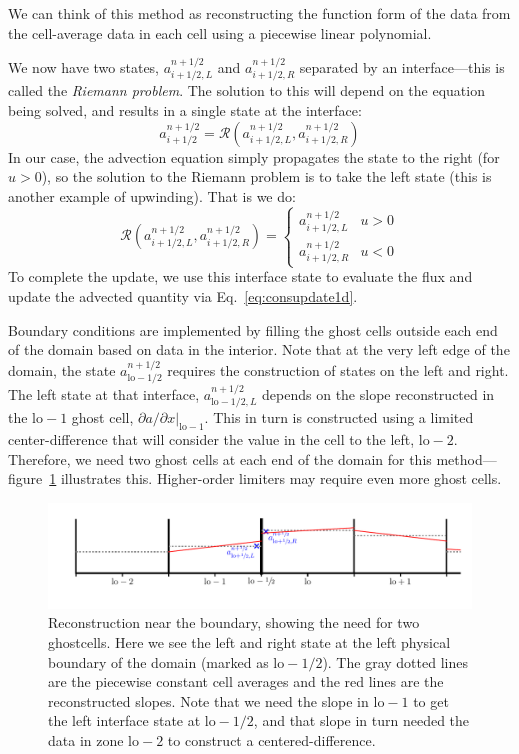 We can think of this method as reconstructing the function form of the
data from the cell-average data in each cell using  a piecewise linear
polynomial. 

We now have two states, $a_{i+1/2,L}^{n+1/2}$ and
$a_{i+1/2,R}^{n+1/2}$ separated by an interface---this is called the
{\em Riemann problem}.
%
The solution to this will depend on the equation being solved, and
results in a single state at the interface:
\begin{equation}
a_{i+1/2}^{n+1/2} = \mathcal{R}(a_{i+1/2,L}^{n+1/2},a_{i+1/2,R}^{n+1/2})
\end{equation}
In our case, the advection equation simply propagates the state to the
right (for $u > 0$), so the solution to the Riemann problem is to take
the left state (this is another example of upwinding).  That is we do:
\begin{equation}
\mathcal{R}(a_{i+1/2,L}^{n+1/2},a_{i+1/2,R}^{n+1/2}) = \left \{ \begin{array}{ccc} a_{i+1/2,L}^{n+1/2} & u > 0 \\[2mm] a_{i+1/2,R}^{n+1/2} & u < 0 \end{array} \right .
\label{eq:riemannsolve}
\end{equation}
To complete the update, we use this interface state to evaluate the flux
and update the advected quantity via Eq.~\ref{eq:consupdate1d}.

Boundary conditions are implemented by filling the ghost cells outside
each end of the domain based on data in the interior.  Note that at
the very left edge of the domain, the state
$a^{n+1/2}_{\mathrm{lo}-1/2}$ requires the construction of states on
the left and right.  The left state at that interface,
$a^{n+1/2}_{\mathrm{lo}-1/2,L}$ depends on the slope reconstructed in
the $\mathrm{lo}-1$ ghost cell, $\partial a/\partial x
|_{\mathrm{lo}-1}$.  This in turn is constructed using a limited
center-difference that will consider the value in the cell to the
left, $\mathrm{lo-2}$.  Therefore, we need two ghost cells at each end
of the domain for this method---figure~\ref{fig:advect_ghost}
illustrates this.  Higher-order limiters may require even more ghost
cells.

\begin{figure}[t]
\centering
\includegraphics[width=0.9\linewidth]{riemann-bc}
\caption[Reconstruction at the domain boundary]
{\label{fig:advect_ghost} Reconstruction near the boundary, showing
the need for two ghostcells.  Here we see the left and right state at the
left physical boundary of the domain (marked as $\mathrm{lo}-1/2$).  The
gray dotted lines are the piecewise constant cell averages and the red lines
are the reconstructed slopes.  Note that we need the slope in $\mathrm{lo}-1$
to get the left interface state at $\mathrm{lo}-1/2$, and that slope in turn
needed the data in zone $\mathrm{lo}-2$ to construct a centered-difference.}
\end{figure}



